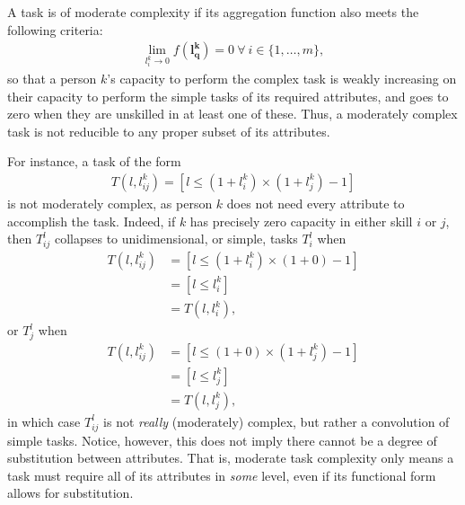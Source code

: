 \documentclass[hidelinks, nonatbib]{elsarticle}
\begin{document}
\begin{definition}
    \begin{subdefinition}
        A task is of moderate complexity if its aggregation function also meets the following criteria:
        \begin{gather}
            \lim_{
                l_{i}^{k} \rightarrow 0
            }{
                f(\boldsymbol{l_{q}^{k}})
            } = 0
            \
            \forall 
            \
            i \in \{1, \dots, m\}
            ,
        \end{gather}
        so that a person $k$'s capacity to perform the complex task is weakly increasing on their capacity to perform the simple tasks of its required attributes, and goes to zero when they are unskilled in at least one of these. Thus, a moderately complex task is not reducible to any proper subset of its attributes.
        
        For instance, a task of the form
    \begin{gather}
        T(l, l_{ij}^{k})
        = [l \leq (1 + l_{i}^{k}) \times (1 + l_{j}^{k}) - 1]
    \end{gather}
    is not moderately complex, as person $k$ does not need every attribute to accomplish the task. Indeed, if $k$ has precisely zero capacity in either skill $i$ or $j$, then $T_{ij}^{l}$ collapses to unidimensional, or simple, tasks $T_{i}^{l}$ when
    \begin{align}
        T(l, l_{ij}^{k})
        &= [l \leq (1 + l_{i}^{k}) \times (1 + 0) - 1]
        \\
        &= [l \leq l_{i}^{k}]
        \\
        &= T(l, l_{i}^{k})
        ,
    \end{align}
    or $T_{j}^{l}$ when
    \begin{align}
        T(l, l_{ij}^{k})
        &= [l \leq (1 + 0) \times (1 + l_{j}^{k}) - 1]
        \\
        &= [l \leq l_{j}^{k}]
        \\
        &= T(l, l_{j}^{k})
        ,
    \end{align}
    in which case $T_{ij}^{l}$ is not \textit{really} (moderately) complex, but rather a convolution of simple tasks. Notice, however, this does not imply there cannot be a degree of substitution between attributes. That is, moderate task complexity only means a task must require all of its attributes in \textit{some} level, even if its functional form allows for substitution.
    
    \end{subdefinition}
    

\end{definition}
\end{document}
